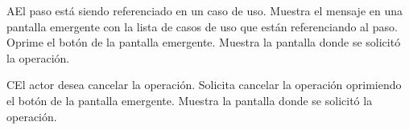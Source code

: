  \begin{UCtrayectoriaA}{A}{El paso está siendo referenciado en un caso de uso.}
    \UCpaso[\UCsist] Muestra el mensaje  en una pantalla emergente
    con la lista de casos de uso que están referenciando al paso.
    \UCpaso[\UCactor] Oprime el botón  de la pantalla emergente.
    \UCpaso[\UCsist] Muestra la pantalla donde se solicitó la operación.
 \end{UCtrayectoriaA}
 \begin{UCtrayectoriaA}{C}{El actor desea cancelar la operación.}
    \UCpaso[\UCactor] Solicita cancelar la operación oprimiendo el botón  de la pantalla emergente.
    \UCpaso[\UCsist] Muestra la pantalla donde se solicitó la operación.
 \end{UCtrayectoriaA} 